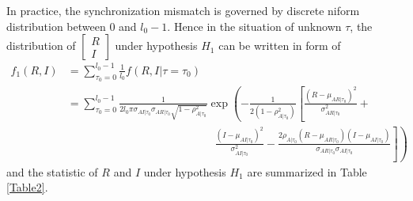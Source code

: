 In practice, the synchronization mismatch is governed by discrete niform distribution between $0$ and $l_0-1$. Hence in the situation of unknown $\tau$, the distribution of  
$\begin{bmatrix}
  R \\
  I
\end{bmatrix}$
under hypothesis $H_1$ can be written in form of 
\begin{equation}
  \begin{split}
	f_1(R, I) &= \sum_{\tau_0 = 0}^{l_0-1} \frac{1}{l_0}f(R, I|\tau=\tau_0)\\
	&= \sum_{\tau_0 = 0}^{l_0-1}\frac{1}{2l_0\pi\sigma_{AI|\tau_0}\sigma_{AR|\tau_0}\sqrt{1 - \rho_{A|\tau_0}^2}}\exp\left( -\frac{1}{2(1-\rho_{A|\tau_0}^2)}\left[ \frac{(R-\mu_{AR|\tau_0})^2}{\sigma_{AR|\tau_0}^2} + \right.\right.\\
	& \left. \left. \;\;\;\;\;\;\;\;\;\;\;\;\;\;\;\; \;\;\;\;\;\;\;\;\;\;\;\;\;\;\;\; \;\;\;\;\;\;\;\;\;\;\;\;\;\;\;\; \frac{(I-\mu_{AI|\tau_0})^2}{\sigma_{AI|\tau_0}^2} - \frac{2\rho_{A|\tau_0}(R-\mu_{AR|\tau_0})(I-\mu_{AI|\tau_0})}{\sigma_{AR|\tau_0}\sigma_{AI|\tau_0}}\right] \right)
  \end{split}
  \label{f_1underH1}
\end{equation}
and the statistic of $R$ and $I$  under hypothesis $H_1$ are summarized in Table \ref{Table2}.
